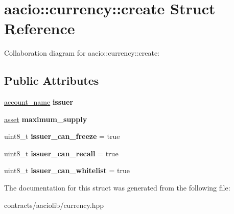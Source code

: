 \hypertarget{structaacio_1_1currency_1_1create}{}\section{aacio\+:\+:currency\+:\+:create Struct Reference}
\label{structaacio_1_1currency_1_1create}


Collaboration diagram for aacio\+:\+:currency\+:\+:create\+:
\subsection*{Public Attributes}
\begin{DoxyCompactItemize}
\item 
\mbox{\label{structaacio_1_1currency_1_1create_a98198099214c9e31d6ac14a5c4c364a0}} 
\mbox{\hyperlink{structaacio_1_1chain_1_1name}{account\+\_\+name}} {\bfseries issuer}
\item 
\mbox{\label{structaacio_1_1currency_1_1create_a06ef9ac9559a9c048c499336dd9cb5dc}} 
\mbox{\hyperlink{structaacio_1_1asset}{asset}} {\bfseries maximum\+\_\+supply}
\item 
\mbox{\label{structaacio_1_1currency_1_1create_a34f36eabc5655f0b169556b79bb1710b}} 
uint8\+\_\+t {\bfseries issuer\+\_\+can\+\_\+freeze} = true
\item 
\mbox{\label{structaacio_1_1currency_1_1create_a1fd1b4cd91d3752effb233adfadc7374}} 
uint8\+\_\+t {\bfseries issuer\+\_\+can\+\_\+recall} = true
\item 
\mbox{\label{structaacio_1_1currency_1_1create_a3620c91bb3ec7b4fce844613b56e38eb}} 
uint8\+\_\+t {\bfseries issuer\+\_\+can\+\_\+whitelist} = true
\end{DoxyCompactItemize}


The documentation for this struct was generated from the following file\+:\begin{DoxyCompactItemize}
\item 
contracts/aaciolib/currency.\+hpp\end{DoxyCompactItemize}
